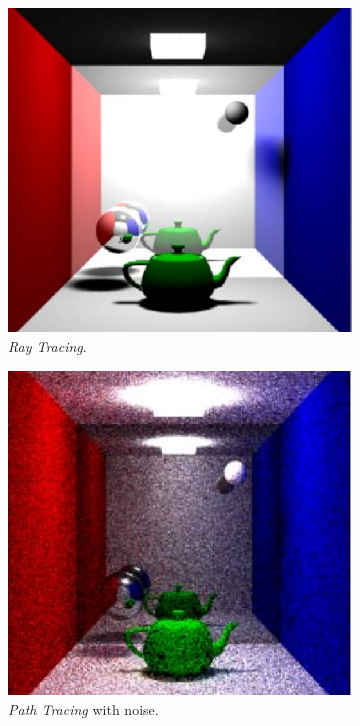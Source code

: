 \documentclass[titlepage,12pt]{article}
\begin{document}
\begin{figure}[H]
	\centering
	\begin{subfigure}{.3\textwidth}
		\centering
		\includegraphics[width=.8\textwidth]{media/RayTracing.png}
		\caption{\textit{Ray Tracing}.}
		\label{RT}
	\end{subfigure}
	\begin{subfigure}{.3\textwidth}
		\centering
		\includegraphics[width=.8\textwidth]{media/PathTracing.png}
		\caption{\textit{Path Tracing} with noise.}
		\label{PTN}
	\end{subfigure}
	\begin{subfigure}{.3\textwidth}
		\centering

\end{subfigure}
\end{figure}
\end{document}
